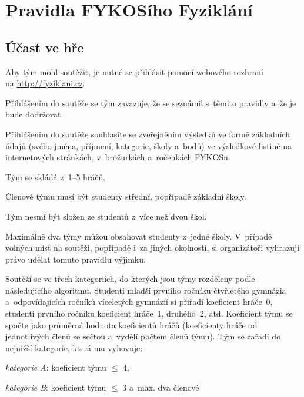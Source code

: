 \documentclass[fykos,\classoptions]{fksgeneric}
\begin{document}
\section{Pravidla FYKOSího Fyziklání}

\maketitle

\subsection*{Účast ve hře}
\begin{compactitem}
	\item Aby tým mohl soutěžit, je nutné se přihlásit pomocí webového rozhraní \\
	na \url{http://fyziklani.cz}.
	\item Přihlášením do soutěže se tým zavazuje, že se seznámil s~těmito pravidly
	a~že je bude dodržovat.
	\item Přihlášením do soutěže souhlasíte se zveřejněním výsledků ve formě
	základních údajů (svého jména, příjmení, kategorie, školy a~bodů) ve výsledkové
	listině na internetových stránkách, v~brožurkách a~ročenkách FYKOSu.
	\item Tým se skládá z~1--5 hráčů.
	\item Členové týmu musí být studenty střední, popřípadě základní školy.
	\item Tým nesmí být složen ze studentů z~více než dvou škol.
	\item Maximálně dva týmy můžou obsahovat studenty z~jedné školy. V~případě
	volných míst na soutěži, popřípadě i~za jiných okolností, si organizátoři
	vyhrazují právo udělat tomuto pravidlu výjimku.
	\item Soutěží se ve třech kategoriích, do kterých jsou týmy rozděleny podle
	následujícího algoritmu. Studenti mladší prvního ročníku čtyřletého gymnázia
	a~odpovídajících ročníků víceletých gymnázií si přiřadí koeficient hráče~0,
	studenti prvního ročníku koeficient hráče~1, druhého~2, atd. Koeficient týmu se
	spočte jako průměrná hodnota koeficientů hráčů (koeficienty hráče od
	jednotlivých členů se sečtou a~vydělí počtem členů týmu). Tým se zařadí do
	nejnižší kategorie, která mu vyhovuje:
	\begin{compactitem}
		\item \emph{kategorie A}: koeficient týmu $\leq$ 4,
		\item \emph{kategorie B}: koeficient týmu $\leq$ 3 a~max. dva členové

\end{compactitem}
\end{compactitem}
\end{document}
